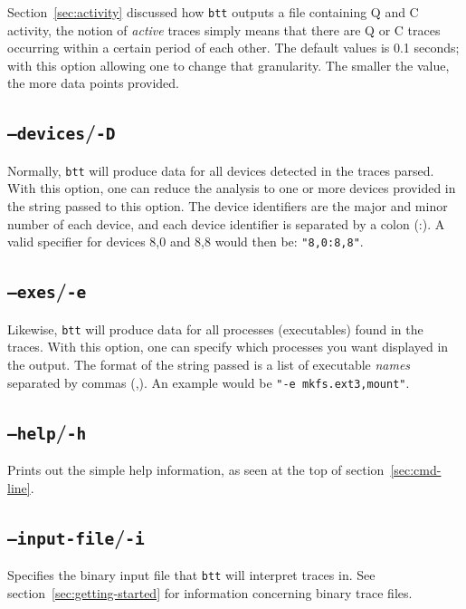 \documentclass{article}
\begin{document}
  Section~\ref{sec:activity} discussed how \texttt{btt} outputs a file
  containing Q and C activity, the notion of \emph{active} traces simply
  means that there are Q or C traces occurring within a certain period
  of each other. The default values is 0.1 seconds; with this option
  allowing one to change that granularity. The smaller the value, the
  more data points provided.

\subsection{\label{sec:o-D}\texttt{--devices}/\texttt{-D}}

  Normally, \texttt{btt} will produce data for all devices detected in
  the traces parsed. With this option, one can reduce the analysis to
  one or more devices provided in the string passed to this option. The
  device identifiers are the major and minor number of each device, and
  each device identifier is separated by a colon (:). A valid specifier
  for devices 8,0 and 8,8 would then be: \texttt{"8,0:8,8"}.

\subsection{\label{sec:o-e}\texttt{--exes}/\texttt{-e}}

  Likewise, \texttt{btt} will produce data for all processes (executables)
  found in the traces. With this option, one can specify which processes
  you want displayed in the output. The format of the string passed is
  a list of executable \emph{names} separated by commas (,). An example
  would be \texttt{"-e mkfs.ext3,mount"}.

\subsection{\label{sec:o-h}\texttt{--help}/\texttt{-h}}

  Prints out the simple help information, as seen at the top of
  section~\ref{sec:cmd-line}.

\subsection{\label{sec:o-i}\texttt{--input-file}/\texttt{-i}}

  Specifies the binary input file that \texttt{btt} will interpret traces
  in. See section~\ref{sec:getting-started} for information concerning
  binary trace files.
\end{document}
